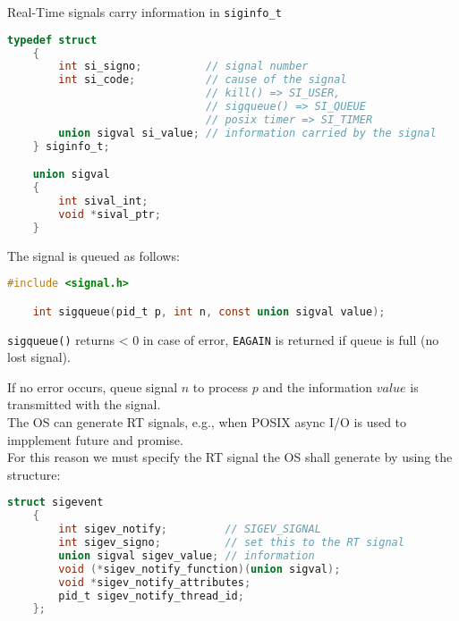 Real-Time signals carry information in \texttt{siginfo\_t}
\begin{lstlisting}[language=C]
    typedef struct
    {
        int si_signo;          // signal number
        int si_code;           // cause of the signal 
                               // kill() => SI_USER, 
                               // sigqueue() => SI_QUEUE
                               // posix timer => SI_TIMER
        union sigval si_value; // information carried by the signal
    } siginfo_t;

    union sigval
    {
        int sival_int;
        void *sival_ptr;
    }
\end{lstlisting}

The signal is queued as follows:
\begin{lstlisting}[language=C]
    #include <signal.h>

    int sigqueue(pid_t p, int n, const union sigval value);
\end{lstlisting}
\texttt{sigqueue()} returns < 0  in case of error, \texttt{EAGAIN} is returned if queue is full (no lost signal).

If no error occurs, queue signal $n$ to process $p$ and the information $value$ is transmitted with the signal.\\
The OS can generate RT signals, e.g., when POSIX async I/O is used to impplement future and promise.\\
For this reason we must specify the RT signal the OS shall generate by using the structure:
\begin{lstlisting}[language=C]
    struct sigevent
    {
        int sigev_notify;         // SIGEV_SIGNAL
        int sigev_signo;          // set this to the RT signal
        union sigval sigev_value; // information
        void (*sigev_notify_function)(union sigval);
        void *sigev_notify_attributes;
        pid_t sigev_notify_thread_id;
    };
\end{lstlisting}

